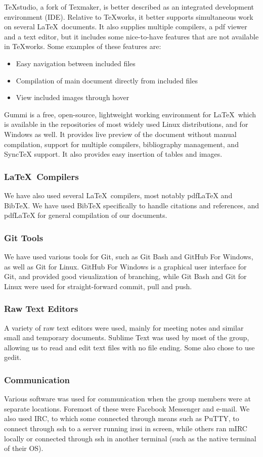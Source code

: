 TeXstudio, a fork of Texmaker, is better described as an integrated development environment (IDE). Relative to TeXworks, it better supports simultaneous work on several \LaTeX \ documents. It also supplies multiple compilers, a pdf viewer and a text editor, but it includes some nice-to-have features that are not available in TeXworks. Some examples of these features are:
\begin{itemize}
\item Easy navigation between included files
\item Compilation of main document directly from included files
\item View included images through hover
\end{itemize}

Gummi is a free, open-source, lightweight working environment for \LaTeX \ which is available in the repositories of most widely used Linux distributions, and for Windows as well. It provides live preview of the document without manual compilation, support for multiple compilers, bibliography management, and SyncTeX support. It also provides easy insertion of tables and images.

\subsubsection{\LaTeX \ Compilers}
We have also used several \LaTeX \ compilers, most notably pdfLaTeX and BibTeX. We have used BibTeX specifically to handle citations and references, and pdfLaTeX for general compilation of our documents.

\subsubsection{Git Tools}
We have used various tools for Git, such as Git Bash and GitHub For Windows, as well as Git for Linux. GitHub For Windows is a graphical user interface for Git, and provided good visualization of branching, while Git Bash and Git for Linux were used for straight-forward commit, pull and push.

\subsubsection{Raw Text Editors}
A variety of raw text editors were used, mainly for meeting notes and similar small and temporary documents. Sublime Text was used by most of the group, allowing us to read and edit text files with no file ending. Some also chose to use gedit.

\subsubsection{Communication}
Various software was used for communication when the group members were at separate locations. Foremost of these were Facebook Messenger and e-mail. We also used IRC, to which some connected through means such as PuTTY, to connect through ssh to a server running irssi in screen, while others ran mIRC locally or connected through ssh in another terminal (such as the native terminal of their OS).

